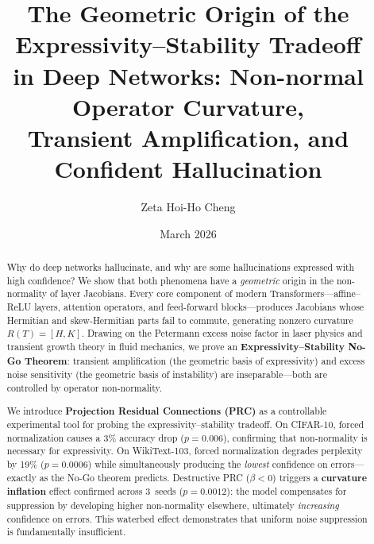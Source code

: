 \documentclass[11pt,a4paper]{article}
\title{The Geometric Origin of the Expressivity--Stability Tradeoff\\
in Deep Networks: Non-normal Operator Curvature,\\
Transient Amplification, and Confident Hallucination}
\author{Zeta Hoi-Ho Cheng}
\date{March 2026}
\theoremstyle{definition}
\begin{document}
\maketitle

\begin{abstract}
Why do deep networks hallucinate, and why are some hallucinations
expressed with high confidence? We show that both phenomena have a
\emph{geometric} origin in the non-normality of layer Jacobians.
Every core component of modern Transformers---affine--ReLU layers,
attention operators, and feed-forward blocks---produces Jacobians
whose Hermitian and skew-Hermitian parts fail to commute, generating
nonzero curvature $R(T) = [H,K]$. Drawing on the Petermann excess
noise factor in laser physics and transient growth theory in fluid
mechanics, we prove an \textbf{Expressivity--Stability No-Go Theorem}:
transient amplification (the geometric basis of expressivity) and
excess noise sensitivity (the geometric basis of instability) are
inseparable---both are controlled by operator non-normality.

We introduce \textbf{Projection Residual Connections (PRC)} as a
controllable experimental tool for probing the expressivity--stability
tradeoff. On CIFAR-10, forced normalization causes a 3\% accuracy
drop ($p = 0.006$), confirming that non-normality is necessary for
expressivity. On WikiText-103, forced normalization degrades
perplexity by 19\% ($p = 0.0006$) while simultaneously producing
the \emph{lowest} confidence on errors---exactly as the No-Go
theorem predicts. Destructive PRC ($\beta < 0$) triggers a
\textbf{curvature inflation} effect confirmed across 3~seeds
($p = 0.0012$): the model compensates for suppression by developing
higher non-normality elsewhere, ultimately \emph{increasing}
confidence on errors. This waterbed effect demonstrates that uniform
noise suppression is fundamentally insufficient.


\end{abstract}
\end{document}
